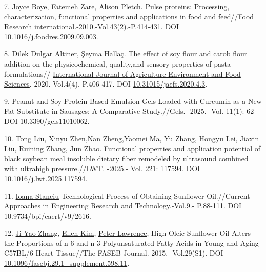 \begin{refs}
7. Joyce Boye, Fatemeh Zare, Alison Pletch. Pulse proteins: Processing,
characterization, functional properties and applications in food and
feed//Food Research international.-2010.-Vol.43(2).-P.414-431. DOI
10.1016/j.foodres.2009.09.003.

8. Dilek Dulgar Altiner,
\href{https://www.researchgate.net/profile/Seyma_Hallac?_tp=eyJjb250ZXh0Ijp7ImZpcnN0UGFnZSI6InB1YmxpY2F0aW9uIiwicGFnZSI6InB1YmxpY2F0aW9uIn19}{Şeyma
Hallaç}. The effect of soy flour and carob flour addition on the
physicochemical, quality,and sensory properties of pasta formulations//
\href{https://www.researchgate.net/journal/International-Journal-of-Agriculture-Environment-and-Food-Sciences-2602-246X?_tp=eyJjb250ZXh0Ijp7ImZpcnN0UGFnZSI6InB1YmxpY2F0aW9uIiwicGFnZSI6InB1YmxpY2F0aW9uIn19}{International
Journal of Agriculture Environment and Food
Sciences}.-2020.-Vol.4(4).-P.406-417. DOI
\href{https://doi.org/10.31015/jaefs.2020.4.3}{10.31015/jaefs.2020.4.3}.

9. Peanut and Soy Protein-Based Emulsion Gels Loaded with Curcumin as a
New Fat Substitute in Sausages: A Comparative Study.//Gels.- 2025.- Vol.
11(1): 62 DOI 10.3390/gels11010062.

10. Tong Liu, Xinyu Zhen,Nan Zheng,Yaomei Ma, Yu Zhang, Hongyu Lei,
Jiaxin Liu, Ruining Zhang, Jun Zhao. Functional properties and
application potential of black soybean meal insoluble
dietary fiber remodeled by ultrasound combined with ultrahigh
pressure.//LWT. -2025.-
\href{https://www.sciencedirect.com/journal/lwt/vol/221/suppl/C}{Vol.
221}: 117594. DOI 10.1016/j.lwt.2025.117594.

11. \href{https://www.researchgate.net/profile/Ioana-Stanciu-3?_tp=eyJjb250ZXh0Ijp7ImZpcnN0UGFnZSI6InB1YmxpY2F0aW9uIiwicGFnZSI6InB1YmxpY2F0aW9uIn19}{Ioana
Stanciu} Technological Process of Obtaining Sunflower Oil.//Current
Approaches in Engineering Research and Technology.-Vol.9.- P.88-111. DOI
10.9734/bpi/caert/v9/2616.

12. \href{https://www.researchgate.net/profile/Ji-Yao-Zhang?_tp=eyJjb250ZXh0Ijp7ImZpcnN0UGFnZSI6InB1YmxpY2F0aW9uIiwicGFnZSI6InB1YmxpY2F0aW9uIn19}{Ji
Yao Zhang},
\href{https://www.researchgate.net/profile/Ellen-Kim-7?_tp=eyJjb250ZXh0Ijp7ImZpcnN0UGFnZSI6InB1YmxpY2F0aW9uIiwicGFnZSI6InB1YmxpY2F0aW9uIn19}{Ellen
Kim},
\href{https://www.researchgate.net/profile/Peter-Lawrence-15?_tp=eyJjb250ZXh0Ijp7ImZpcnN0UGFnZSI6InB1YmxpY2F0aW9uIiwicGFnZSI6InB1YmxpY2F0aW9uIn19}{Peter
Lawrence}, High Oleic Sunflower Oil Alters the Proportions of n‐6 and
n‐3 Polyunsaturated Fatty Acids in Young and Aging C57BL/6 Heart
Tissue//The FASEB Journal.-2015.- Vol.29(S1). DOI
\href{https://doi.org/10.1096/fasebj.29.1_supplement.598.11?urlappend=?utm_source=researchgate.net&utm_medium=article}{10.1096/fasebj.29.1\_supplement.598.11}.


\end{refs}
